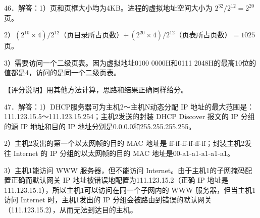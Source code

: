 \documentclass[UTF8,11pt]{ctexart}
\begin{document}
46．解答：1）页和页框大小均为4KB。进程的虚拟地址空间大小为 \(\displaystyle 2^{32}/2^{12}=2^{20}\) 页。


2）\(\displaystyle (2^{10}\times4)/2^{12}\)（页目录所占页数）\(\displaystyle +\,(2^{20}\times4)/2^{12}\)（页表所占页数）\(\displaystyle =1025\) 页。


3）需要访问一个二级页表。因为虚拟地址0100 0000H和0111 2048H的最高10位的值都是4，访问的是同一个二级页表。


【评分说明】用其他方法计算，思路和结果正确同样给分。


47．解答：1）DHCP服务器可为主机2～主机N动态分配 IP 地址的最大范围是：111.123.15.5～111.123.15.254；主机2发送的封装 DHCP Discover 报文的 IP 分组的源 IP 地址和目的 IP 地址分别是0.0.0.0和255.255.255.255。


2）主机2发出的第一个以太网帧的目的 MAC 地址是 ff-ff-ff-ff-ff-ff；封装主机2发往 Internet 的 IP 分组的以太网帧的目的 MAC 地址是00-a1-a1-a1-a1-a1。


3）主机1能访问 WWW 服务器，但不能访问 Internet。由于主机1的子网掩码配置正确而默认网关 IP 地址被错误地配置为111.123.15.2（正确 IP 地址是111.123.15.1），所以主机1可以访问在同一个子网内的 WWW 服务器，但当主机1访问 Internet 时，主机1发出的 IP 分组会被路由到错误的默认网关（111.123.15.2），从而无法到达目的主机。
\end{document}
